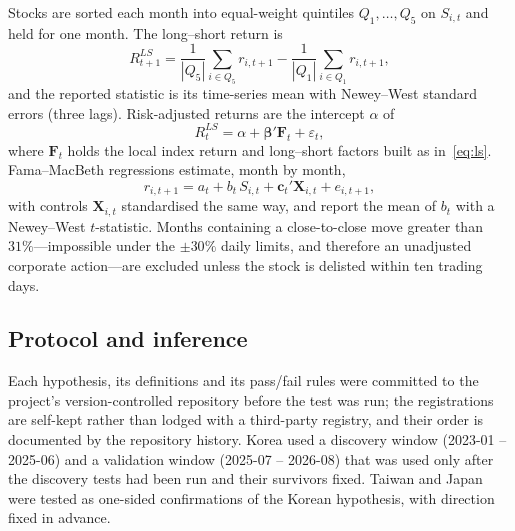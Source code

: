 \documentclass[12pt,a4paper]{article}
\begin{document}
Stocks are sorted each month into equal-weight quintiles $Q_1,\dots,Q_5$ on
$S_{i,t}$ and held for one month. The long--short return is
\begin{equation}
R^{LS}_{t+1} = \frac{1}{|Q_5|}\sum_{i\in Q_5} r_{i,t+1} - \frac{1}{|Q_1|}\sum_{i\in Q_1} r_{i,t+1},
\label{eq:ls}
\end{equation}
and the reported statistic is its time-series mean with Newey--West standard errors (three lags). Risk-adjusted
returns are the intercept $\alpha$ of
\begin{equation}
R^{LS}_{t} = \alpha + \boldsymbol{\beta}'\mathbf{F}_t + \varepsilon_t,
\label{eq:alpha}
\end{equation}
where $\mathbf{F}_t$ holds the local index return and long--short factors built as in~\eqref{eq:ls}. Fama--MacBeth
regressions estimate, month by month,
\begin{equation}
r_{i,t+1} = a_t + b_t\, S_{i,t} + \mathbf{c}_t'\mathbf{X}_{i,t} + e_{i,t+1},
\label{eq:fm}
\end{equation}
with controls $\mathbf{X}_{i,t}$ standardised the same way, and report the mean of $b_t$ with a Newey--West $t$-statistic.
Months containing a close-to-close move greater than $31\%$---impossible under the $\pm 30\%$ daily limits, and therefore
an unadjusted corporate action---are excluded unless the stock is delisted within ten trading days.

\subsection{Protocol and inference}

Each hypothesis, its definitions and its pass/fail rules were committed to the project's
version-controlled repository before the test was run; the registrations are self-kept rather than lodged with a
third-party registry, and their order is documented by the repository history. Korea used a discovery window
(2023-01 -- 2025-06) and a validation window (2025-07 -- 2026-08) that was used only after the discovery tests had been
run and their survivors fixed. Taiwan and Japan were tested as one-sided
confirmations of the Korean hypothesis, with direction fixed in advance.
\end{document}
